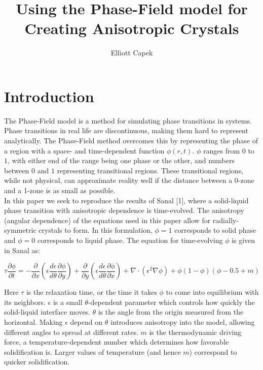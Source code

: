 \documentclass[10pt]{article} %
\title{Using the Phase-Field model for Creating Anisotropic Crystals}
\author{Elliott Capek}
\begin{document}
\maketitle{}

\section{Introduction}
The Phase-Field model is a method for simulating phase transitions in systems. Phase transitions in real life are discontinuous, making them hard to represent analytically. The Phase-Field method overcomes this by representing the phase of a region with a space- and time-dependent function $\phi(r,t)$. $\phi$ ranges from $0$ to $1$, with either end of the range being one phase or the other, and numbers between $0$ and $1$ representing transitional regions. These transitional regions, while not physical, can approximate reality well if the distance between a 0-zone and a 1-zone is as small as possible. \\

In this paper we seek to reproduce the results of Sanal [1], where a solid-liquid phase transition with anisotropic dependence is time-evolved. The anisotropy (angular dependence) of the equations used in this paper allow for radially-symmetric crystals to form. In this formulation, $\phi=1$ corresponds to solid phase and $\phi=0$ corresponds to liquid phase. The equation for time-evolving $\phi$ is given in Sanal as:

\begin{equation}  \label{eq:dPhidt}
  \tau \frac{\partial \phi}{\partial t} = -\frac{\partial}{\partial x} \left(\epsilon \frac{d\epsilon}{d\theta}\frac{\partial\phi}{\partial y}\right) + \frac{\partial}{\partial y} \left(\epsilon \frac{d\epsilon}{d\theta}\frac{\partial \phi}{\partial x}\right) + \nabla \cdot \left(\epsilon^2\nabla\phi\right) + \phi\left(1-\phi\right)\left(\phi-0.5+m\right)
\end{equation}

Here $\tau$ is the relaxation time, or the time it takes $\phi$ to come into equilibrium with its neighbors. $\epsilon$ is a small $\theta$-dependent parameter which controls how quickly the solid-liquid interface moves. $\theta$ is the angle from the origin measured from the horizontal. Making $\epsilon$ depend on $\theta$ introduces anisotropy into the model, allowing different angles to spread at different rates. $m$ is the thermodynamic driving force, a temperature-dependent number which determines how favorable solidification is. Larger values of temperature (and hence $m$) correspond to quicker solidification. \\
\end{document}
